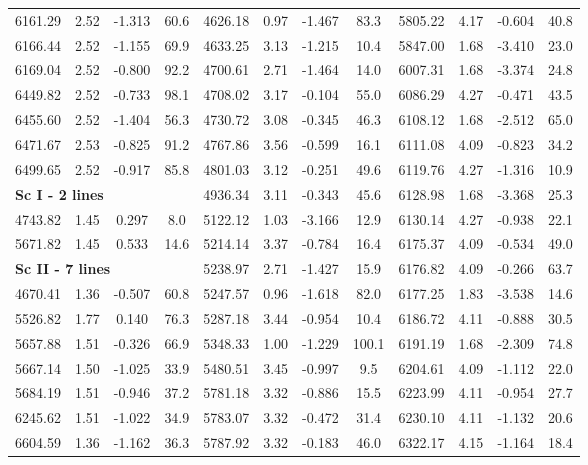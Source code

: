 \documentclass[dvips,12pt,a4paper]{report}
\begin{document}
{{\begin{table}[h!]
\begin{tabular}{c c c c | c c c c | c c c c}
6161.29 & 2.52 & -1.313 &  60.6 & 4626.18 & 0.97 & -1.467 &  83.3 & 5805.22 & 4.17 & -0.604 &  40.8 \\
6166.44 & 2.52 & -1.155 &  69.9 & 4633.25 & 3.13 & -1.215 &  10.4 & 5847.00 & 1.68 & -3.410 &  23.0 \\
6169.04 & 2.52 & -0.800 &  92.2 & 4700.61 & 2.71 & -1.464 &  14.0 & 6007.31 & 1.68 & -3.374 &  24.8 \\
6449.82 & 2.52 & -0.733 &  98.1 & 4708.02 & 3.17 & -0.104 &  55.0 & 6086.29 & 4.27 & -0.471 &  43.5 \\
6455.60 & 2.52 & -1.404 &  56.3 & 4730.72 & 3.08 & -0.345 &  46.3 & 6108.12 & 1.68 & -2.512 &  65.0 \\
6471.67 & 2.53 & -0.825 &  91.2 & 4767.86 & 3.56 & -0.599 &  16.1 & 6111.08 & 4.09 & -0.823 &  34.2 \\
6499.65 & 2.52 & -0.917 &  85.8 & 4801.03 & 3.12 & -0.251 &  49.6 & 6119.76 & 4.27 & -1.316 &  10.9 \\
\multicolumn{3}{l}{\textbf{Sc I - 2 lines}} &  & 4936.34 & 3.11 & -0.343 &  45.6 & 6128.98 & 1.68 & -3.368 &  25.3 \\
4743.82 & 1.45 &  0.297 &   8.0 & 5122.12 & 1.03 & -3.166 &  12.9 & 6130.14 & 4.27 & -0.938 &  22.1 \\
5671.82 & 1.45 &  0.533 &  14.6 & 5214.14 & 3.37 & -0.784 &  16.4 & 6175.37 & 4.09 & -0.534 &  49.0 \\
\multicolumn{3}{l}{\textbf{Sc II - 7 lines}} & & 5238.97 & 2.71 & -1.427 &  15.9 & 6176.82 & 4.09 & -0.266 &  63.7 \\
4670.41 & 1.36 & -0.507 &  60.8 & 5247.57 & 0.96 & -1.618 &  82.0 & 6177.25 & 1.83 & -3.538 &  14.6 \\
5526.82 & 1.77 &  0.140 &  76.3 & 5287.18 & 3.44 & -0.954 &  10.4 & 6186.72 & 4.11 & -0.888 &  30.5 \\
5657.88 & 1.51 & -0.326 &  66.9 & 5348.33 & 1.00 & -1.229 & 100.1 & 6191.19 & 1.68 & -2.309 &  74.8 \\
5667.14 & 1.50 & -1.025 &  33.9 & 5480.51 & 3.45 & -0.997 &   9.5 & 6204.61 & 4.09 & -1.112 &  22.0 \\
5684.19 & 1.51 & -0.946 &  37.2 & 5781.18 & 3.32 & -0.886 &  15.5 & 6223.99 & 4.11 & -0.954 &  27.7 \\
6245.62 & 1.51 & -1.022 &  34.9 & 5783.07 & 3.32 & -0.472 &  31.4 & 6230.10 & 4.11 & -1.132 &  20.6 \\
6604.59 & 1.36 & -1.162 &  36.3 & 5787.92 & 3.32 & -0.183 &  46.0 & 6322.17 & 4.15 & -1.164 &  18.4 \\

\end{tabular}
\end{table}}}
\end{document}
